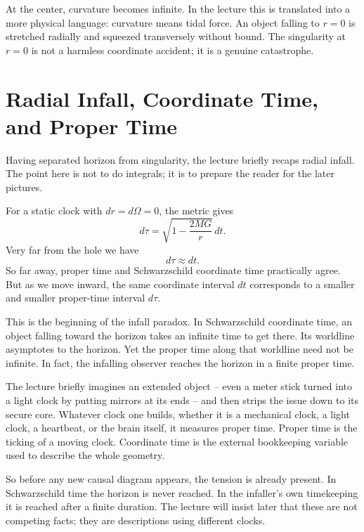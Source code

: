 At the center, curvature becomes infinite. In the lecture this is translated into a more physical language: curvature means tidal force. An object falling to \(r=0\) is stretched radially and squeezed transversely without bound. The singularity at \(r=0\) is not a harmless coordinate accident; it is a genuine catastrophe.

\section{Radial Infall, Coordinate Time, and Proper Time}

Having separated horizon from singularity, the lecture briefly recaps radial infall. The point here is not to do integrals; it is to prepare the reader for the later pictures.

For a static clock with \(dr=d\Omega=0\), the metric gives
\begin{equation}
d\tau
=
\sqrt{1-\frac{2MG}{r}}\,dt.
\end{equation}
Very far from the hole we have
\begin{equation}
d\tau\approx dt.
\end{equation}
So far away, proper time and Schwarzschild coordinate time practically agree. But as we move inward, the same coordinate interval \(dt\) corresponds to a smaller and smaller proper-time interval \(d\tau\).

This is the beginning of the infall paradox. In Schwarzschild coordinate time, an object falling toward the horizon takes an infinite time to get there. Its worldline asymptotes to the horizon. Yet the proper time along that worldline need not be infinite. In fact, the infalling observer reaches the horizon in a finite proper time.

The lecture briefly imagines an extended object -- even a meter stick turned into a light clock by putting mirrors at its ends -- and then strips the issue down to its secure core. Whatever clock one builds, whether it is a mechanical clock, a light clock, a heartbeat, or the brain itself, it measures proper time. Proper time is the ticking of a moving clock. Coordinate time is the external bookkeeping variable used to describe the whole geometry.

So before any new causal diagram appears, the tension is already present. In Schwarzschild time the horizon is never reached. In the infaller's own timekeeping it is reached after a finite duration. The lecture will insist later that these are not competing facts; they are descriptions using different clocks.

